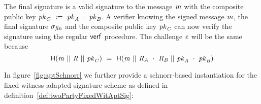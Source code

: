The final signature is a valid signature to the message $\mathit{m}$ with the composite public key $\mathit{pk}_{\mathit{C}} ~:=~ \mathit{pk}_{\mathit{A}} ~\cdot~ \mathit{pk}_{\mathit{B}}$.
A verifier knowing the signed message $\mathit{m}$, the final signature $\sigma_{\mathit{fin}}$ and the composite public key $\mathit{pk}_{\mathit{C}}$ can now verify the signature using the regular $\mathsf{verf}$ procedure.
The challenge $\mathit{e}$ will be the same because
\[ \mathsf{H} (\mathit{m} ~||~ \mathit{R} ~||~ \mathit{pk}_{\mathit{C}}) ~=~ \mathsf{H} (\mathit{m} ~||~ \mathit{R}_{\mathit{A}} ~\cdot~ \mathit{R}_{\mathit{B}} ~||~ \mathit{pk}_{\mathit{A}} ~\cdot~ \mathit{pk}_{\mathit{B}}) \]

In figure~\ref{fig:aptSchnorr} we further provide a schnorr-based instantiation for the fixed witness adapted signature scheme as defined in definition~\ref{def:twoPartyFixedWitAptSig}:

